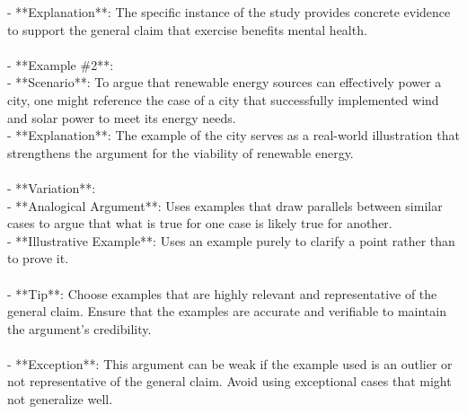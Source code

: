 \documentclass[a4paper,12pt,single,pdftex]{scrbook}
\begin{document}
    
        - **Explanation**: The specific instance of the study provides concrete evidence to support the general claim that exercise benefits mental health.
    \\

    
      
    \\

    
      - **Example \#2**:
    \\

    
        - **Scenario**: To argue that renewable energy sources can effectively power a city, one might reference the case of a city that successfully implemented wind and solar power to meet its energy needs.
    \\

    
        - **Explanation**: The example of the city serves as a real-world illustration that strengthens the argument for the viability of renewable energy.
    \\

    
      
    \\

    
      - **Variation**:
    \\

    
        - **Analogical Argument**: Uses examples that draw parallels between similar cases to argue that what is true for one case is likely true for another.
    \\

    
        - **Illustrative Example**: Uses an example purely to clarify a point rather than to prove it.
    \\

    
      
    \\

    
      - **Tip**: Choose examples that are highly relevant and representative of the general claim. Ensure that the examples are accurate and verifiable to maintain the argument’s credibility.
    \\

    
      
    \\

    
      - **Exception**: This argument can be weak if the example used is an outlier or not representative of the general claim. Avoid using exceptional cases that might not generalize well.
    \\
\end{document}
